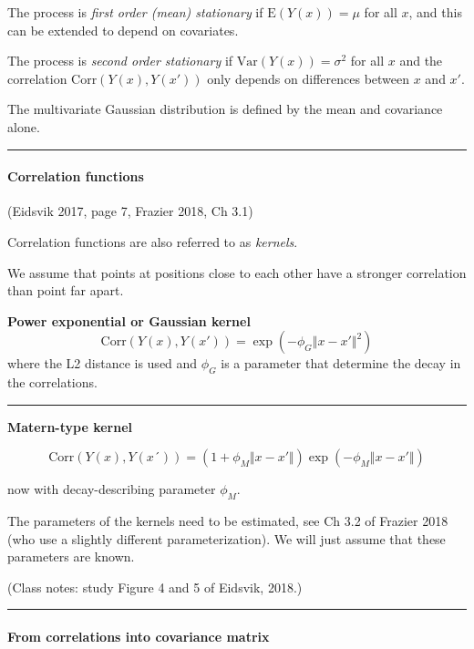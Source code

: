 \documentclass[
  letterpaper,
  DIV=11,
  numbers=noendperiod]{scrartcl}
\let\oldparagraph\paragraph
\renewcommand{\paragraph}[1]{\oldparagraph{#1}\mbox{}}
\begin{document}
The process is \emph{first order (mean) stationary} if
\(\text{E}(Y(x))=\mu\) for all \(x\), and this can be extended to depend
on covariates.

The process is \emph{second order stationary} if
\(\text{Var}(Y(x))=\sigma^2\) for all \(x\) and the correlation
\(\text{Corr}(Y(x),Y(x'))\) only depends on differences between \(x\)
and \(x'\).

The multivariate Gaussian distribution is defined by the mean and
covariance alone.

\begin{center}\rule{0.5\linewidth}{0.5pt}\end{center}

\hypertarget{correlation-functions}{%
\paragraph{Correlation functions}\label{correlation-functions}}

(Eidsvik 2017, page 7, Frazier 2018, Ch 3.1)

Correlation functions are also referred to as \emph{kernels}.

We assume that points at positions close to each other have a stronger
correlation than point far apart.

\textbf{Power exponential or Gaussian kernel}
\[ \text{Corr}(Y(x),Y(x'))=\exp(-\phi_G \Vert x-x' \Vert ^2)\] where the
L2 distance is used and \(\phi_G\) is a parameter that determine the
decay in the correlations.

\begin{center}\rule{0.5\linewidth}{0.5pt}\end{center}

\textbf{Matern-type kernel}

\[\text{Corr}(Y(x),Y(x´))=(1+\phi_M \Vert x - x' \Vert)\exp(-\phi_M \Vert x - x' \Vert)\]

now with decay-describing parameter \(\phi_M\).

The parameters of the kernels need to be estimated, see Ch 3.2 of
Frazier 2018 (who use a slightly different parameterization). We will
just assume that these parameters are known.

(Class notes: study Figure 4 and 5 of Eidsvik, 2018.)

\begin{center}\rule{0.5\linewidth}{0.5pt}\end{center}

\hypertarget{from-correlations-into-covariance-matrix}{%
\paragraph{From correlations into covariance
matrix}\label{from-correlations-into-covariance-matrix}}
\end{document}
